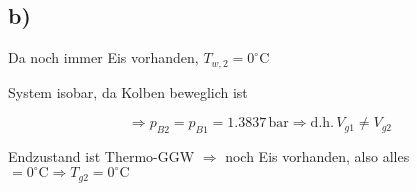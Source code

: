 

\subsection*{b)}
Da noch immer Eis vorhanden, $T_{w,2} = 0^\circ \text{C}$

System isobar, da Kolben beweglich ist

\[
\Rightarrow p_{B2} = p_{B1} = 1.3837 \, \text{bar} \Rightarrow \text{d.h.} \, V_{g1} \neq V_{g2}
\]

Endzustand ist Thermo-GGW $\Rightarrow$ noch Eis vorhanden, also alles $= 0^\circ \text{C} \Rightarrow T_{g2} = 0^\circ \text{C}$